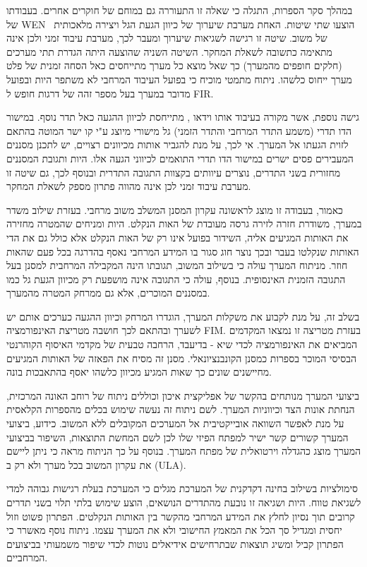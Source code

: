 \par
במהלך סקר הספרות, התגלה כי שאלה זו התעוררה גם במוחם של חוקרים אחרים.
בעבודתו של 
\textenglish{WEN}~\cite{wen2013extending}
הוצעו שתי שיטות.
האחת מערבת שיערוך של כיוון הגעת הגל ויצירה מלאכותית של משוב.
שיטה זו רגישה לשגיאות שיערוך ומעבר לכך, מערבת עיבוד זמני ולכן אינה מתאימה כתשובה לשאלת המחקר.
השיטה השניה שהוצעה היתה הגדרת תתי מערכים (חלקים חופפים מהמערך) כך שאל מוצא כל מערך מתייחסים כאל הסחה זמנית של פלט מערך ייחוס כלשהו.
ניתוח מתמטי מוכיח כי בפועל העיבוד המרחבי לא משתפר היות ובפועל מדובר במערך בעל מספר זהה של  דרגות חופש ל
\textenglish{FIR}.
\par
גישה נוספת, אשר מקורה בעיבוד אותו וידאו 
\cite{bruton1985three}
, מתייחסת לכיוון ההגעה כאל תדר נוסף.
במישור הדו תדרי (משמע התדר המרחבי והתדר הזמני) גל מישורי מיוצג ע"י קו ישר המוטה בהתאם לזוית הגעתו אל המערך.
אי לכך, על מנת להגביר אותות מכיוונים רצויים, יש לתכנן מסננים המעבירים פסים ישרים במישור הדו תדרי התואמים לכיווני הגעה אלו.
היות ותגובת המסננים מחזורית בשני התדרים, נוצרים עיוותים בקצוות התגובה התדרית ובנוסף לכך, גם שיטה זו מערבת עיבוד זמני לכן אינה מהווה פתרון מספק לשאלת המחקר.
\par
כאמור, בעבודה זו מוצג לראשונה עקרון המסנן המשלב משוב מרחבי.
בעזרת שילוב משדר במערך, משודרת חזרה לזירה גרסה מעובדת של האות הנקלט.
היות ומניחים שהמטרה מחזירה את האותות המגיעים אליה, השידור בפועל אינו רק של האות הנקלט אלא כולל גם את  הדי האותות שנקלטו בעבר ובכך נוצר חוג סגור בו המידע המרחבי נאסף בהדרגה בכל פעם שהאות חוזר.
מניתוח המערך עולה כי בשילוב המשוב, תגובתו הינה המקבילה המרחבית למסנן בעל התגובה הזמנית האינסופית.
בנוסף, עולה כי התגובה אינה מושפעת רק מכיוון הגעת גל כמו במסננים המוכרים, אלא גם ממרחק המטרה מהמערך. 
\par
בשלב זה, על מנת לקבוע את משקלות המערך, הוגדרו המרחק וכיוון ההגעה כערכים אותם יש לשערך ובהתאם לכך חושבה מטריצת האינפורמציה 
\textenglish{FIM}.
בעזרת מטריצה זו נמצאו המקדמים המביאים את האינפורמציה לכדי שיא - בדיעבד, הרחבה טבעית של מקדמי האיסוף הקוהרנטי הבסיסי המוכר בספרות כמסנן הקונבנציונאלי.
מסנן זה מסיח את הפאזה של האותות המגיעים מחיישנים שונים כך שאות המגיע מכיוון כלשהו יאסף בהתאבכות בונה.
\par
ביצועי המערך מנותחים בהקשר של אפליקצית איכון וכוללים ניתוח של רוחב האונה המרכזית, הנחתת אונות הצד וכיווניות המערך.
לשם ניתוח זה נעשה שימוש בכלים מהספרות הקלאסית על מנת לאפשר השוואה אובייקטיבית אל המערכים המקובלים ללא המשוב.
כידוע, ביצועי המערך קשורים קשר ישיר למפתח הפיזי שלו לכן לשם המחשת התוצאות, השיפור בביצועי המערך מוצג כהגדלה וירטואלית של מפתח המערך.
בנוסף על כך הניתוח מראה כי ניתן ליישם את עקרון המשוב בכל מערך ולא רק ב 
\textenglish{(ULA)}.
\par
סימולציות בשילוב בחינה דקדקנית של המערכת מגלים כי המערכת בעלת רגישות גבוהה למדי לשגיאת טווח.
היות ושגיאה זו נובעת מהתדרים הנושאים, הוצע שימוש בלתי תלוי בשני תדרים קרובים תוך נסיון לחלץ את המידע המרחבי מהקשר בין האותות הנקלטים.
הפתרון פשוט וזול יחסית ומגדיל סך הכל את המאמץ החישובי ולא את המערך עצמו.
ניתוח נוסף מאשרר כי הפתרון קביל ומשיג תוצאות שבתרחישים אידיאלים נוטות לכדי שיפור משמעותי בביצועים המרחביים.